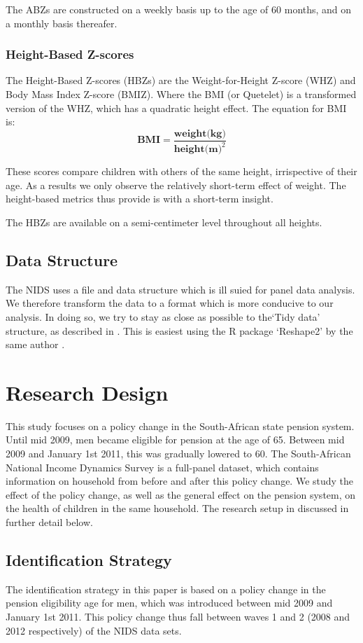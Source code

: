 \begin{refsection}
The ABZs are constructed on a weekly basis up to the age of 60 months, and on a monthly basis thereafer.


\subsubsection{Height-Based Z-scores}
The Height-Based Z-scores (HBZs) are the Weight-for-Height Z-score (WHZ)
and Body Mass Index Z-score (BMIZ).
Where the BMI (or Quetelet) is a transformed version of the WHZ, which has a quadratic height effect.
The equation for BMI is:
\[
\textbf{BMI} = \frac{\textbf{weight(kg)}}{\textbf{height(m)}^2}
\]

These scores compare children with others of the same height, irrispective of their age.
As a results we only observe the relatively short-term effect of weight.
The height-based metrics thus provide is with a short-term insight.

The HBZs are available on a semi-centimeter level throughout all heights.

\subsection{Data Structure}
The NIDS uses a file and data structure which is ill suied for panel data analysis.
We therefore transform the data to a format which is more conducive to our analysis.
In doing so, we try to stay as close as possible to the`Tidy data' structure, as described in \textcite{wickham2014tidy}.
This is easiest using the R package `Reshape2' by the same author \parencite[Reshape2 implementation]{wickham2007reshaping}.

\section{Research Design}
This study focuses on a policy change in the South-African state pension system.
Until mid 2009, men became eligible for pension at the age of 65.
Between mid 2009 and January 1st 2011, this was gradually lowered to 60.
The South-African National Income Dynamics Survey is a full-panel dataset,
which contains information on household from before and after this policy change.
We study the effect of the policy change,
as well as the general effect on the pension system,
on the health of children in the same household.
The research setup in discussed in further detail below.


\subsection{Identification Strategy}
\label{sa:identification}
The identification strategy in this paper is based on a policy change in the pension eligibility age for men,
which was introduced between mid 2009 and January 1st 2011.
This policy change thus fall between waves 1 and 2 (2008 and 2012 respectively) of the NIDS data sets.


\end{refsection}

